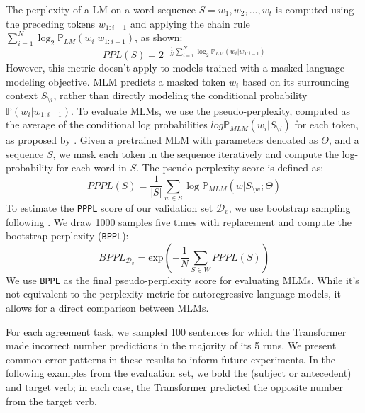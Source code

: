 The perplexity of a LM on a word sequence $S = w_1, w_2, ..., w_t$ is computed using the preceding tokens $w_{1:i-1}$ and applying the chain rule $\sum_{i=1}^{N} \log_2 \mathbb{P}_{LM}(w_i | w_{1:i-1})$, as shown:
\begin{equation}
PPL(S) = 2^{-\frac{1}{N} \sum_{i=1}^{N} \log_2 \mathbb{P}_{LM}(w_i | w_{1:i-1})}
\end{equation}
However, this metric doesn't apply to models trained with a masked language modeling objective. MLM predicts a masked token $w_i$ based on its surrounding context $S_{ \setminus i}$, rather than directly modeling the conditional probability $\mathbb{P}(w_i | w_{1:i-1})$. To evaluate MLMs, we use the pseudo-perplexity, computed as the average of the conditional log probabilities $log \mathbb{P}_{MLM}(w_i | S_{ \setminus i})$ for each token, as proposed by \cite{salazar-etal-2020-masked}. Given a pretrained MLM with parameters denoated as $\Theta$, and a sequence $S$, we mask each token in the sequence iteratively and compute the log-probability for each word in $S$. The pseudo-perplexity score is defined as: 
\begin{equation}
PPPL(S) = \frac{1}{|S|} \sum_{w \in S} \log \mathbb{P}_{MLM}(w|S_{ \setminus w}; \Theta)
\end{equation}
To estimate the \texttt{PPPL} score of our validation set $\mathcal{D}_{v}$, we use bootstrap sampling following \cite{sinha-etal-2021-masked}. We draw 1000 samples five times with replacement and compute the bootstrap perplexity (\texttt{BPPL}):
\begin{equation}
BPPL_{\mathcal{D}_{v}} = \text{exp} \left( - \frac{1}{N} \sum_{S \in W} PPPL(S) \right)
\end{equation}
We use \texttt{BPPL} as the final pseudo-perplexity score for evaluating MLMs. While it's not equivalent to the perplexity metric for autoregressive language models, it allows for a direct comparison between MLMs.%


 \label{app:NA_error_pattern}
For each agreement task, we sampled 100 sentences for which the Transformer made incorrect number predictions in the majority of its 5 runs. We present common error patterns in these results to inform future experiments. In the following examples from the evaluation set, we bold the \cue (subject or antecedent) and target verb; in each case, the Transformer predicted the opposite number from the target verb.

